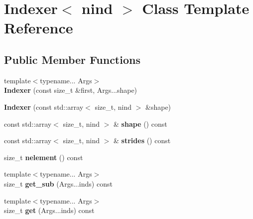 \hypertarget{classIndexer}{}\section{Indexer$<$ nind $>$ Class Template Reference}
\label{classIndexer}
\subsection*{Public Member Functions}
\begin{DoxyCompactItemize}
\item 
{\footnotesize template$<$typename... Args$>$ }\\{\bfseries Indexer} (const size\+\_\+t \&first, Args...\+shape)\hypertarget{classIndexer_a49e72ceaf15c37f9e9b5e6303701d8ea}{}\label{classIndexer_a49e72ceaf15c37f9e9b5e6303701d8ea}

\item 
{\bfseries Indexer} (const std\+::array$<$ size\+\_\+t, nind $>$ \&shape)\hypertarget{classIndexer_a577b3db95c7010f954e251fb98f1ada2}{}\label{classIndexer_a577b3db95c7010f954e251fb98f1ada2}

\item 
const std\+::array$<$ size\+\_\+t, nind $>$ \& {\bfseries shape} () const \hypertarget{classIndexer_a49bb6423a81106c236de39ecb4e667b9}{}\label{classIndexer_a49bb6423a81106c236de39ecb4e667b9}

\item 
const std\+::array$<$ size\+\_\+t, nind $>$ \& {\bfseries strides} () const \hypertarget{classIndexer_a3e118489047b65241b07345748bc399c}{}\label{classIndexer_a3e118489047b65241b07345748bc399c}

\item 
size\+\_\+t {\bfseries nelement} () const \hypertarget{classIndexer_ad50ba9630c8f27685b07142a12c018e5}{}\label{classIndexer_ad50ba9630c8f27685b07142a12c018e5}

\item 
{\footnotesize template$<$typename... Args$>$ }\\size\+\_\+t {\bfseries get\+\_\+sub} (Args...\+inds) const \hypertarget{classIndexer_afb867c0d51d0f0e5698a686a7c63458f}{}\label{classIndexer_afb867c0d51d0f0e5698a686a7c63458f}

\item 
{\footnotesize template$<$typename... Args$>$ }\\size\+\_\+t {\bfseries get} (Args...\+inds) const \hypertarget{classIndexer_aaf72062a13f8feb8d0e7d93001c979cf}{}\label{classIndexer_aaf72062a13f8feb8d0e7d93001c979cf}

\end{DoxyCompactItemize}
